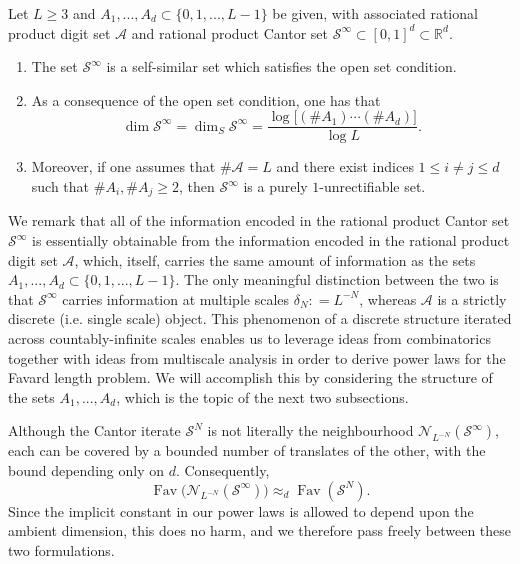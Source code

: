 \documentclass[12pt]{amsart}
\numberwithin{equation}{section}
\DeclareMathOperator{\Fav}{Fav}
\begin{document}
\begin{proposition}
Let $L \geq 3$ and $A_1,...,A_d \subset \{0,1,...,L-1\}$ be given, with associated rational product digit set $\mathcal{A}$ and rational product Cantor set $\mathcal{S}^{\infty} \subset [0,1]^d \subset \mathbb{R}^d$.
\begin{enumerate}[(1)]
    \item The set $\mathcal{S}^{\infty}$ is a self-similar set which satisfies the open set condition.
    \smallskip
    \item As a consequence of the open set condition, one has that
    $$
    \dim \mathcal{S}^{\infty} = \dim_S \mathcal{S}^{\infty} = \frac{\log\big[(\# A_1)\cdots (\# A_d)\big]}{\log L}.
    $$
    \smallskip
    \item Moreover, if one assumes that $\# \mathcal{A} = L$ and there exist indices $1 \leq i \neq j \leq d$ such that $\#A_i, \#A_j \geq 2$, then $\mathcal{S}^{\infty}$ is a purely $1$-unrectifiable set.
\end{enumerate}
\end{proposition}

We remark that all of the information encoded in the rational product Cantor set $\mathcal{S}^{\infty}$ is essentially obtainable from the information encoded in the rational product digit set $\mathcal{A}$, which, itself, carries the same amount of information as the sets $A_1,...,A_d \subset \{0,1,...,L-1\}$. The only meaningful distinction between the two is that $\mathcal{S}^{\infty}$ carries information at multiple scales $\delta_N : = L^{-N}$, whereas $\mathcal{A}$ is a strictly discrete (i.e. single scale) object. This phenomenon of a discrete structure iterated across countably-infinite scales enables us to leverage ideas from combinatorics together with ideas from multiscale analysis in order to derive power laws for the Favard length problem. We will accomplish this by considering the structure of the sets $A_1,...,A_d$, which is the topic of the next two subsections.



\begin{remark}
Although the Cantor iterate $\mathcal{S}^N$ is not literally the neighbourhood $\mathcal{N}_{L^{-N}}(\mathcal{S}^\infty)$, each can be covered by a bounded number of translates of the other, with the bound depending only on $d$.  Consequently,
\begin{equation}\label{eq:squaresandballs}
\Fav\big(\mathcal{N}_{L^{-N}}(\mathcal{S}^\infty)\big)\approx_d \Fav(\mathcal{S}^N).
\end{equation}
Since the implicit constant in our power laws is allowed to depend upon the ambient dimension, this does no harm, and we therefore pass freely between these two formulations.
\end{remark}
\end{document}
